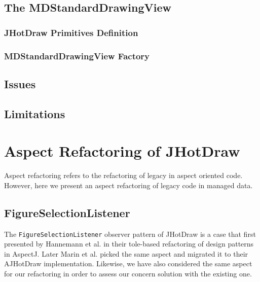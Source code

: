 \subsection{The MDStandardDrawingView}
\subsubsection{JHotDraw Primitives Definition}


\subsubsection{MDStandardDrawingView Factory}

\subsection{Issues}

\subsection{Limitations}

\section{Aspect Refactoring of JHotDraw}
Aspect refactoring refers to the refactoring of legacy in aspect oriented code. 
However, here we present an aspect refactoring of legacy code in managed data.

\subsection{FigureSelectionListener}
The \texttt{FigureSelectionListener} observer pattern of JHotDraw is a case that first presented by Hannemann et al. \cite{hannemann2005role} in their tole-based refactoring of design patterns in AspectJ. 
Later Marin et al. picked the same aspect and migrated it to their AJHotDraw implementation.
Likewise, we have also considered the same aspect for our refactoring in order to assess our concern solution with the existing one.

